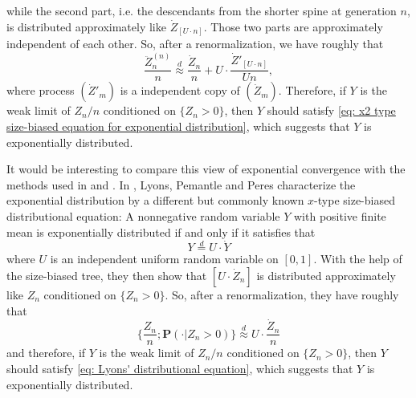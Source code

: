 \documentclass[12pt,a4paper]{amsart}
\numberwithin{equation}{section}
\begin{document}
	while the second part, i.e. 
the descendants from the shorter spine at generation $n$, 
	is distributed approximately like $\dot Z_{[U\cdot n]}$. 
	Those two parts are approximately independent of each other.
	So, after a renormalization, we have roughly that
\begin{equation}
\label{eq: Our insight}
	\frac{\ddot Z_n^{(n)}}{n} 
	\overset{d} \approx \frac{\dot Z_n}{n} + U \cdot \frac{\dot Z'_{[U\cdot n]}}{Un},
\end{equation} 
	where process $(\dot Z'_m)$ is a independent copy of $(\dot Z_m)$.
	Therefore, if $Y$ is the weak limit of 
 $Z_n/n$ conditioned on $\{Z_n > 0\}$, 
	then $Y$ should satisfy \eqref{eq: x2 type size-biased equation for exponential distribution}, which suggests that $Y$ is exponentially distributed. 
	
	It would be interesting to compare this view of exponential convergence with the methods used in \cite{geiger2000new} and \cite{lyons1995conceptual}. 
	In \cite{lyons1995conceptual}, Lyons, Pemantle and Peres characterize the exponential distribution by a different but commonly known $x$-type size-biased distributional equation: 
	A nonnegative random variable $Y$ with positive finite mean is exponentially distributed if and only if it satisfies that 
\begin{equation}
\label{eq: Lyons' distributional equation}
		Y 		\overset{d}= U \cdot \dot Y
\end{equation}
	where $U$ is an independent uniform random variable on $[0,1]$.
With the help of the size-biased tree, they then show
	that $[U \cdot \dot Z_n]$ is distributed approximately like $Z_n$ conditioned on $\{Z_n > 0\}$. 
	So, after a renormalization, they have roughly that 
\begin{equation}
\label{eq: Lyons' insight}
	\big\{\frac{Z_n}{n} ; \mathbf P(  \cdot| Z_n > 0) \big\} 
	\overset{d}{\approx} U \cdot \frac{ \dot Z_n}{n}
\end{equation}
	and therefore, if $Y$ is the weak limit of 
$Z_n/n$ conditioned on $\{Z_n > 0\}$, 
	then $Y$ should satisfy \eqref{eq: Lyons' distributional equation}, which suggests that $Y$ is exponentially distributed. 
	
\end{document}
